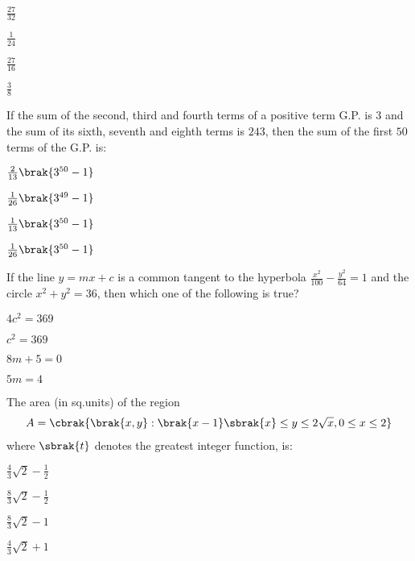       \begin{enumerate}
      \begin{multicols}{4}
      \item $\frac{27}{32}$
      \item $\frac{1}{24}$
      \item $\frac{27}{16}$
      \item $\frac{3}{8}$
      \end{multicols}
      \end{enumerate}
      \item If the sum of the second, third and fourth terms of a positive term G.P. is $3$ and the sum of its sixth, seventh and eighth terms is $243$, then the sum of the first $50$ terms of the G.P. is:
       \begin{enumerate}
      \begin{multicols}{4}
      \item $\frac{2}{13}\brak{3^{50}-1}$
      \item $\frac{1}{26}\brak{3^{49}-1}$
      \item $\frac{1}{13}\brak{3^{50}-1}$\item $\frac{1}{26}\brak{3^{50}-1}$
      \end{multicols}
      \end{enumerate}
     \item If the line $y=mx+c$ is a common tangent to the hyperbola $\frac{x^{2}}{100} - \frac{y^{2}}{64}=1$ and the circle $x^{2}+y^{2}=36$, then which one of the following is true?
      \begin{enumerate}
      \begin{multicols}{4}
      \item $4c^{2}=369$
      \item $c^{2}=369$
      \item $8m+5=0$
      \item $5m=4$
      \end{multicols}
      \end{enumerate}
      \item The area (in sq.units) of the region 
	      \begin{align}
		      A = \cbrak{\brak{x,y}:\brak{x-1} \sbrak{x} \leq y \leq 2\sqrt{x}, 0\leq x\leq 2}
	      \end{align}
	      where $\sbrak{t}$ denotes the greatest integer function, is:
      \begin{enumerate}
      \begin{multicols}{4}
      \item $\frac{4}{3}\sqrt{2}-\frac{1}{2}$
      \item $\frac{8}{3}\sqrt{2}-\frac{1}{2}$
      \item $\frac{8}{3}\sqrt{2}-1$
      \item $\frac{4}{3}\sqrt{2}+1$
      \end{multicols}
      \end{enumerate}
